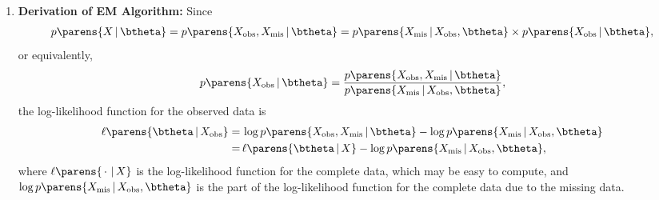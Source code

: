 \documentclass[12pt]{article}
\begin{document}
\begin{enumerate}[label=\textbf{\arabic*.}]
	\item \textbf{Derivation of EM Algorithm:} Since 
	\begin{align*}
		p \parens{X \,\vert\, \btheta} = p \parens{X_{\mathrm{obs}}, X_{\mathrm{mis}} \,\vert\, \btheta} = p \parens{X_{\mathrm{mis}} \,\vert\, X_{\mathrm{obs}}, \btheta} \times p \parens{X_{\mathrm{obs}} \,\vert\, \btheta}, 
	\end{align*}
	or equivalently, 
	\begin{align*}
		p \parens{X_{\mathrm{obs}} \,\vert\, \btheta} = \frac{p \parens{X_{\mathrm{obs}}, X_{\mathrm{mis}} \,\vert\, \btheta}}{p \parens{X_{\mathrm{mis}} \,\vert\, X_{\mathrm{obs}}, \btheta}}, 
	\end{align*}
	the log-likelihood function for the observed data is 
	\begin{align}
		\ell \parens{\btheta \,\vert\, X_{\mathrm{obs}}} = & \, \log p \parens{X_{\mathrm{obs}}, X_{\mathrm{mis}} \,\vert\, \btheta} - \log p \parens{X_{\mathrm{mis}} \,\vert\, X_{\mathrm{obs}}, \btheta} \nonumber \\ 
		= & \, \ell \parens{\btheta \,\vert\, X} - \log p \parens{X_{\mathrm{mis}} \,\vert\, X_{\mathrm{obs}}, \btheta}, \label{eq-em1}
	\end{align}
	where $\ell \parens{\,\cdot\, \,\vert\, X}$ is the log-likelihood function for the complete data, which may be easy to compute, and $\log p \parens{X_{\mathrm{mis}} \,\vert\, X_{\mathrm{obs}}, \btheta}$ is the part of the log-likelihood function for the complete data due to the missing data. 
	

\end{enumerate}
\end{document}
